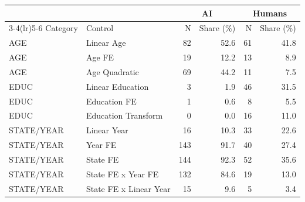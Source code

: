 \begin{tabular}{@{}l l r r r r@{}}
\toprule
 &  & \multicolumn{2}{c}{AI} & \multicolumn{2}{c}{Humans} \\
\cmidrule(lr){3-4}\cmidrule(lr){5-6}
Category & Control & N & Share (\%) & N & Share (\%) \\
\midrule
AGE & Linear Age & 82 & 52.6 & 61 & 41.8 \\
AGE & Age FE & 19 & 12.2 & 13 & 8.9 \\
AGE & Age Quadratic & 69 & 44.2 & 11 & 7.5 \\
EDUC & Linear Education & 3 & 1.9 & 46 & 31.5 \\
EDUC & Education FE & 1 & 0.6 & 8 & 5.5 \\
EDUC & Education Transform & 0 & 0.0 & 16 & 11.0 \\
STATE/YEAR & Linear Year & 16 & 10.3 & 33 & 22.6 \\
STATE/YEAR & Year FE & 143 & 91.7 & 40 & 27.4 \\
STATE/YEAR & State FE & 144 & 92.3 & 52 & 35.6 \\
STATE/YEAR & State FE x Year FE & 132 & 84.6 & 19 & 13.0 \\
STATE/YEAR & State FE x Linear Year & 15 & 9.6 & 5 & 3.4 \\
\bottomrule
\end{tabular}